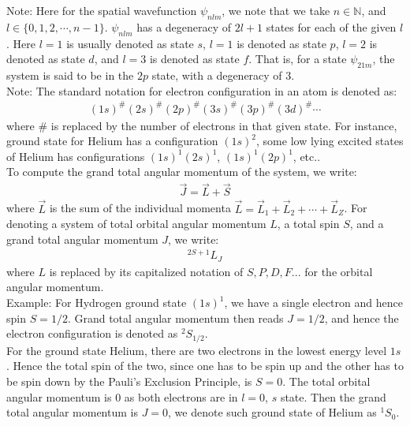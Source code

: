 \documentclass[11pt]{book}
\theoremstyle{break}
\theoremstyle{break}
\newcommand{\N}{\mathbb{N}}
\newcommand{\note}{\color{red}Note: \color{black}}
\newcommand{\example}{\color{green}Example: \color{black}}
\begin{document}
\note Here for the spatial wavefunction $\psi_{nlm}$, we note that we take $n \in \N$, and $l \in \{0,1,2,\cdots, n-1\}$. $\psi_{nlm}$ has a degeneracy of $2l+1$ states for each of the given $l$. Here $l=1$ is usually denoted as state $s$, $l=1$ is denoted as state $p$, $l=2$ is denoted as state $d$, and $l=3$ is denoted as state $f$. That is, for a state $\psi_{21m}$, the system is said to be in the $2p$ state, with a degeneracy of $3$.\\ 

\note The standard notation for electron configuration in an atom is denoted as: 
\begin{align*}
(1s)^\#(2s)^\#(2p)^\#(3s)^\#(3p)^\#(3d)^\#\cdots
\end{align*}
where $\#$ is replaced by the number of electrons in that given state. For instance, ground state for Helium has a configuration $(1s)^2$, some low lying excited states of Helium has configurations $(1s)^1(2s)^1$, $(1s)^1(2p)^1$, etc..\\ 

To compute the grand total angular momentum of the system, we write:
\begin{align*}
\vec{J} = \vec{L} + \vec{S}
\end{align*}
where $\vec{L}$ is the sum of the individual momenta $\vec{L} = \vec{L}_1 + \vec{L}_2 + \cdots + \vec{L}_Z$. For denoting a system of total orbital angular momentum $L$, a total spin $S$, and a grand total angular momentum $J$, we write:
\begin{align*}
^{2S+1}L_J
\end{align*}
where $L$ is replaced by its capitalized notation of $S,P,D,F...$ for the orbital angular momentum. \\


\example 
For Hydrogen ground state $(1s)^1$, we have a single electron and hence spin $S = 1/2$. Grand total angular momentum then reads $J = 1/2$, and hence the electron configuration is denoted as $^2S_{1/2}$.\\

For the ground state Helium, there are two electrons in the lowest energy level $1s$. Hence the total spin of the two, since one has to be spin up and the other has to be spin down by the Pauli's Exclusion Principle, is $S = 0$. The total orbital angular momentum is $0$ as both electrons are in $l=0$, $s$ state. Then the grand total angular momentum is $J = 0$, we denote such ground state of Helium as $^1S_0$. \\
\end{document}
